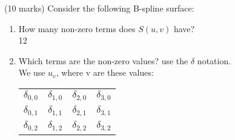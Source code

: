 (10 marks) Consider the following B-spline surface: \\

\begin{enumerate}
\item How many non-zero terms does $S(u,v)$ have?  \\
12
\item Which terms are the non-zero values? use the $\delta$ notation. \\
We use $u_{v}$, where v are these values: \\
\begin{tabular}{cccc}
$\delta_{0,0}$  &   $\delta_{1,0}$    &   $\delta_{2,0}$  &   $\delta_{3,0}$ \\
$\delta_{0,1}$  &   $\delta_{1,1}$    &   $\delta_{2,1}$  &   $\delta_{3,1}$ \\
$\delta_{0,2}$  &   $\delta_{1,2}$    &   $\delta_{2,2}$  &   $\delta_{3,2}$ \\
\end{tabular}
\end{enumerate}


